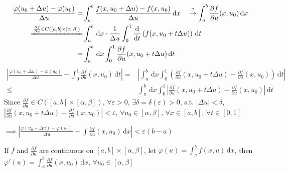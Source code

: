 \begin{align*}
    \frac{\varphi(u_0+\Delta u)-\varphi(u_0)}{\Delta u}=                                  & \int_a^b\frac{f(x,u_0+\Delta u)-f(x,u_0)}{\Delta u}\,\mathrm{d}x\quad\overset{?}{\to}\int_a^b\frac{\partial f}{\partial u}(x,u_0)\,\mathrm{d}x \\
    \xlongequal{\frac{\partial f}{\partial u}\in C\left([a,b]\times[\alpha,\beta]\right)} & \int_a^b\,\mathrm{d}x\cdot\frac{1}{\Delta u}\int_0^1\frac{\mathrm{d}}{\mathrm{d}t}\left(f(x,u_0+t\Delta u)\right)\,\mathrm{d}t                 \\
    =                                                                                     & \int_a^b\,\mathrm{d}x\int_0^1\frac{\partial f}{\partial u}(x,u_0+t\Delta u)\,\mathrm{d}t
\end{align*}
\begin{align*}
    \left|\frac{\varphi(u_0+\Delta u)-\varphi(u_0)}{\Delta u}-\int_0^1\frac{\partial f}{\partial u}(x,u_0)\,\mathrm{d}t\right|= & \left|\int_a^b\,\mathrm{d}x\int_0^1\left(\frac{\partial f}{\partial u}(x,u_0+t\Delta u)-\frac{\partial f}{\partial u}(x,u_0)\right)\,\mathrm{d}t\right| \\
    \leq                                                                                                                        & \int_a^b\,\mathrm{d}x\int_0^1\left|\frac{\partial f}{\partial u}(x,u_0+t\Delta u)-\frac{\partial f}{\partial u}(x,u_0)\right|\,\mathrm{d}t
\end{align*}
Since $\frac{\partial f}{\partial u}\in C\left([a,b]\times[\alpha,\beta]\right)$, $\forall \varepsilon>0$, $\exists\delta=\delta(\varepsilon)>0$, s.t. $|\Delta u|<\delta$, $\left|\frac{\partial f}{\partial u}(x,u_0+t\Delta u)-\frac{\partial f}{\partial u}(x,u_0)\right|<\varepsilon$, $\forall u_0\in[\alpha,\beta]$, $\forall x\in[a,b]$, $\forall t\in[0,1]$

$\implies\left|\frac{\varphi(u_0+\Delta u)-\varphi(u_0)}{\Delta u}-\int\frac{\partial f}{\partial u}(x,u_0)\,\mathrm{d}x\right|<\varepsilon(b-a)$

\begin{theorem}
    If $f$ and $\frac{\partial f}{\partial u}$ are continuous on $[a,b]\times[\alpha,\beta]$, let $\varphi(u)=\int_a^b f(x,u)\,\mathrm{d}x$, then $\varphi'(u)=\int_a^b\frac{\partial f}{\partial u}(x,u_0)\,\mathrm{d}x$, $\forall u_0\in[\alpha,\beta]$
\end{theorem}


